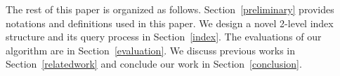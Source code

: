 The rest of this paper is organized as follows. Section~\ref{preliminary} provides notations and definitions used in this paper. We design a novel 2-level index structure and its query process in Section~\ref{index}. The evaluations of our algorithm are in Section~\ref{evaluation}. We discuss previous works in Section~\ref{relatedwork} and conclude our work in Section~\ref{conclusion}.

